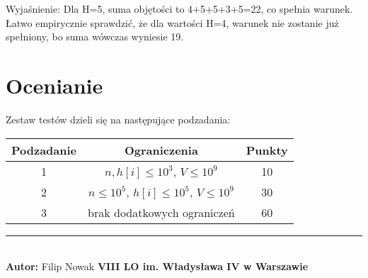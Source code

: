 \documentclass[a4paper,11pt]{article}
\newcommand{\tasktitle}{Dostawa Piwa}
\newcommand{\taskshort}{PIW}
\newcommand{\contestinfo}{Konkurs Świąteczny 2024 - Grupa Początkująca.}
\newcommand{\memorylimit}{256 MB}
\newcommand{\exampleinput}{5 20\\4\\8\\7\\3\\6}
\newcommand{\exampleoutput}{5}
\newcommand{\explanation}{Dla H=5, suma objętości to 4+5+5+3+5=22, co spełnia warunek. Łatwo empirycznie sprawdzić, że dla wartości H=4, warunek nie zostanie już spełniony, bo suma wówczas wyniesie 19.}
\newcommand{\subtasktable}{%
\begin{tabular}{|c|c|c|}
\hline
Podzadanie & Ograniczenia & Punkty \\
\hline
1 & $n, h[i] \leq 10^3$, $V \leq 10^9$ & 10 \\
2 & $n \leq 10^5$,  $h[i] \leq 10^5$, $V \leq 10^9$ & 30 \\
3 & brak dodatkowych ograniczeń & 60 \\
\hline
\end{tabular}}
\begin{document}
\noindent Wyjaśnienie: \explanation

\section*{Ocenianie}
Zestaw testów dzieli się na następujące podzadania:
\begin{center}
\subtasktable
\end{center}

\vspace*{\fill}
\noindent\rule{\textwidth}{0.4pt} \\
\small \textbf{Autor:} Filip Nowak \hfill \textbf{VIII LO im. Władysława IV w Warszawie}

\end{document}
